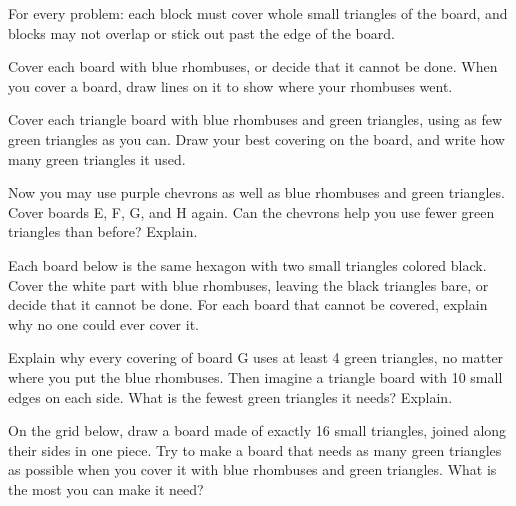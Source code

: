 \documentclass[14pt]{extarticle}
\begin{document}
For every problem: each block must cover whole small triangles of the board, and
blocks may not overlap or stick out past the edge of the board.

\bigskip
{}Cover each board with blue rhombuses, or decide that it cannot be
done. When you cover a board, draw lines on it to show where your rhombuses went.

\medskip
\par\noindent {}\par
\vspace{0.3in}

\newpage
{}Cover each triangle board with blue rhombuses and green triangles,
using as few green triangles as you can. Draw your best covering on the board,
and write how many green triangles it used.

\medskip
\par\noindent {}\blkgap{}\par
\vspace{0.3in}

\newpage
{}

\vspace{0.4in}
Now you may use purple chevrons as well as blue rhombuses and green
triangles. Cover boards E, F, G, and H again. Can the chevrons help you use fewer
green triangles than before? Explain.

\medskip
\par\noindent {}\blkgap{}\blkgap{}\par
{}

\newpage
{}Each board below is the same hexagon with two small triangles colored
black. Cover the white part with blue rhombuses, leaving the black triangles
bare, or decide that it cannot be done. For each board that cannot be covered,
explain why no one could ever cover it.

\vspace{0.3in}

\newpage
{}Explain why every covering of board G uses at least 4 green
triangles, no matter where you put the blue rhombuses. Then imagine a triangle
board with 10 small edges on each side. What is the fewest green triangles it
needs? Explain.


\vspace{0.35in}
On the grid below, draw a board made of exactly 16 small triangles,
joined along their sides in one piece. Try to make a board that needs as many
green triangles as possible when you cover it with blue rhombuses and green
triangles. What is the most you can make it need?

\vspace{0.25in}
\end{document}
